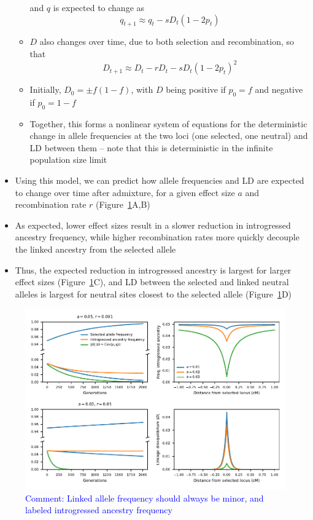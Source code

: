 \documentclass{article}
\newcommand{\aprcomment}[1]{{\textcolor{blue}{Comment: #1}}}
\begin{document}
\begin{itemize}
\begin{itemize}
                and $q$ is expected to change as \[q_{t+1} \approx q_t - s D_t(1-2p_t)\]
            \item $D$ also changes over time, due to both selection and recombination,
                so that \[D_{t+1} \approx D_t - r D_t - s D_t (1-2p_t)^2\]
            \item Initially, $D_0 = \pm f(1-f)$, with $D$ being positive if $p_0=f$
                and negative if $p_0=1-f$
            \item Together, this forms a nonlinear system of equations for the
                deterministic change in allele frequencies at the two loci (one
                selected, one neutral) and LD between them -- note that this is
                deterministic in the infinite population size limit
        \end{itemize}
    \item Using this model, we can predict how allele frequencies and LD are expected
        to change over time after admixture, for a given effect size $a$ and 
        recombination rate $r$ (Figure~\ref{fig:linkage-pred}A,B)
    \item As expected, lower effect sizes result in a slower reduction in introgressed
        ancestry frequency, while higher recombination rates more quickly decouple
        the linked ancestry from the selected allele
    \item Thus, the expected reduction in introgressed ancestry is largest for
        larger effect sizes (Figure~\ref{fig:linkage-pred}C), and LD between the
        selected and linked neutral alleles is largest for neutral sites closest
        to the selected allele (Figure~\ref{fig:linkage-pred}D)
\end{itemize}


\begin{figure}[t!]
    \centering
    \includegraphics{../figures/linkage_predictions.pdf}
    \caption{
        \textbf{}
        \aprcomment{Linked allele frequency should always be minor, and labeled
        introgressed ancestry frequency}
    }
    \label{fig:linkage-pred}
\end{figure}
\end{document}

